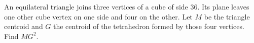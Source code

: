 An equilateral triangle joins three vertices of a cube of side $36$. Its plane leaves one other cube vertex on one side and four on the other. Let $M$ be the triangle centroid and $G$ the centroid of the tetrahedron formed by those four vertices. Find $MG^2$.
